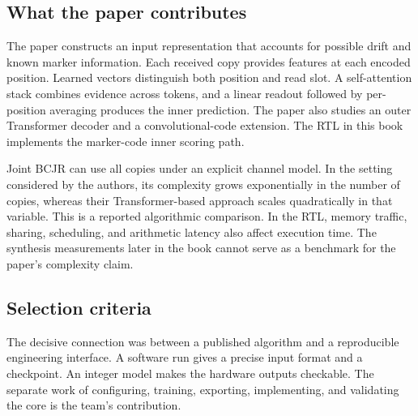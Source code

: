 \subsection{What the paper contributes}
The paper constructs an input representation that accounts for possible drift and known marker information. Each received copy provides features at each encoded position. Learned vectors distinguish both position and read slot. A self-attention stack combines evidence across tokens, and a linear readout followed by per-position averaging produces the inner prediction. The paper also studies an outer Transformer decoder and a convolutional-code extension. The RTL in this book implements the marker-code inner scoring path.

Joint BCJR can use all copies under an explicit channel model. In the setting considered by the authors, its complexity grows exponentially in the number of copies, whereas their Transformer-based approach scales quadratically in that variable. This is a reported algorithmic comparison. In the RTL, memory traffic, sharing, scheduling, and arithmetic latency also affect execution time. The synthesis measurements later in the book cannot serve as a benchmark for the paper's complexity claim.

\subsection{Selection criteria}
The decisive connection was between a published algorithm and a reproducible engineering interface. A software run gives a precise input format and a checkpoint. An integer model makes the hardware outputs checkable. The separate work of configuring, training, exporting, implementing, and validating the core is the team's contribution.
\clearpage

